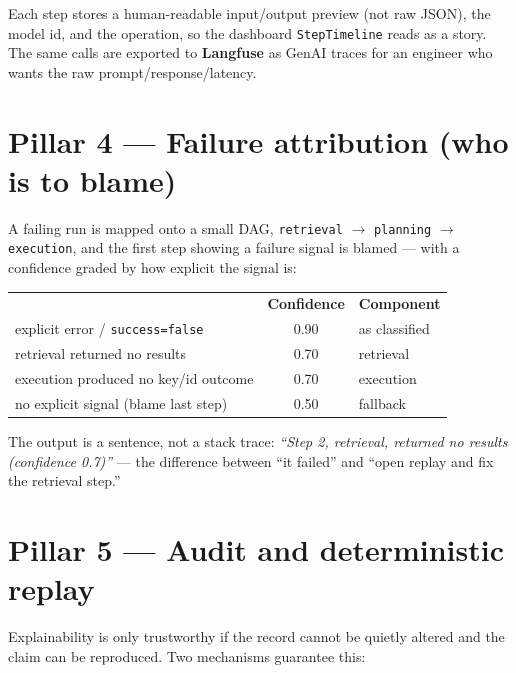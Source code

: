 \documentclass[11pt]{article}
\begin{document}
Each step stores a human-readable input/output preview (not raw JSON), the model id, and the
operation, so the dashboard \texttt{StepTimeline} reads as a story. The same calls are exported
to \textbf{Langfuse} as GenAI traces for an engineer who wants the raw prompt/response/latency.

\section{Pillar 4 --- Failure attribution (who is to blame)}
A failing run is mapped onto a small DAG, \texttt{retrieval} $\to$ \texttt{planning} $\to$
\texttt{execution}, and the first step showing a failure signal is blamed --- with a confidence
graded by how explicit the signal is:

\begin{center}
\begin{tabular}{@{}p{6.8cm} c p{5.2cm}@{}}
\toprule
\rowcolor{headerbg}\multicolumn{1}{@{}>{\bfseries\color{white}}l}{Signal} & \color{white}\bfseries Confidence & \color{white}\bfseries Component \\
explicit error / \texttt{success=false} & 0.90 & as classified \\
retrieval returned no results & 0.70 & retrieval \\
execution produced no key/id outcome & 0.70 & execution \\
no explicit signal (blame last step) & 0.50 & fallback \\
\bottomrule
\end{tabular}
\end{center}
The output is a sentence, not a stack trace: \emph{``Step 2, retrieval, returned no results
(confidence 0.7)''} --- the difference between ``it failed'' and ``open replay and fix the
retrieval step.''

\section{Pillar 5 --- Audit and deterministic replay}
Explainability is only trustworthy if the record cannot be quietly altered and the claim can be
reproduced. Two mechanisms guarantee this:
\end{document}

